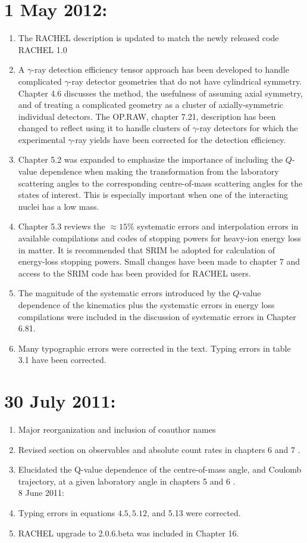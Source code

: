 \documentclass[10pt]{article}
\begin{document}
\section*{1 May 2012:}
\begin{enumerate}
  \item The RACHEL description is updated to match the newly released code RACHEL 1.0
  \item A $\gamma$-ray detection efficiency tensor approach has been developed to handle complicated $\gamma$-ray detector geometries that do not have cylindrical symmetry. Chapter 4.6 discusses the method, the usefulness of assuming axial symmetry, and of treating a complicated geometry as a cluster of axially-symmetric individual detectors. The OP.RAW, chapter 7.21, description has been changed to reflect using it to handle clusters of $\gamma$-ray detectors for which the experimental $\gamma$-ray yields have been corrected for the detection efficiency.
  \item Chapter 5.2 was expanded to emphasize the importance of including the $Q$-value dependence when making the transformation from the laboratory scattering angles to the corresponding centre-of-mass scattering angles for the states of interest. This is especially important when one of the interacting nuclei has a low mass.
  \item Chapter 5.3 reviews the $\approx 15 \%$ systematic errors and interpolation errors in available compilations and codes of stopping powers for heavy-ion energy loss in matter. It is recommended that SRIM be adopted for calculation of energy-loss stopping powers. Small changes have been made to chapter 7 and access to the SRIM code has been provided for RACHEL users.
  \item The magnitude of the systematic errors introduced by the $Q$-value dependence of the kinematics plus the systematic errors in energy loss compilations were included in the discussion of systematic errors in Chapter 6.81.
  \item Many typographic errors were corrected in the text. Typing errors in table 3.1 have been corrected.
\end{enumerate}

\section*{30 July 2011:}
\begin{enumerate}
  \item Major reorganization and inclusion of coauthor names
  \item Revised section on observables and absolute count rates in chapters 6 and 7 .
  \item Elucidated the Q-value dependence of the centre-of-mass angle, and Coulomb trajectory, at a given laboratory angle in chapters 5 and 6 .\\
8 June 2011:
  \item Typing errors in equations $4.5,5.12$, and 5.13 were corrected.
  \item RACHEL upgrade to 2.0.6.beta was included in Chapter 16.
\end{enumerate}
\end{document}
